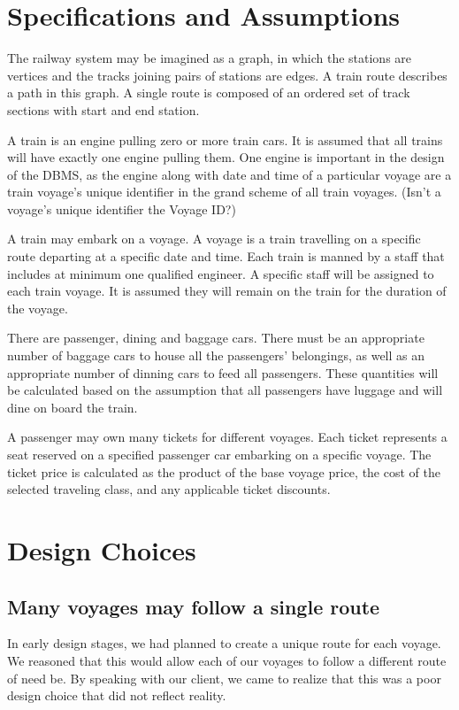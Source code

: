 \documentclass[a4paper]{article}
\begin{document}
\section{Specifications and Assumptions}
The railway system may be imagined as a graph, in which the stations are vertices and the tracks joining pairs of stations are edges. A train route describes a path in this graph.  A single route is composed of an ordered set of track sections with start and end station.

A train is an engine pulling zero or more train cars. It is assumed that all trains will have exactly one engine pulling them. One engine is important in the design of the DBMS, as the engine along with date and time of a particular voyage are a train voyage’s unique identifier in the grand scheme of all train voyages.  (Isn’t a voyage’s unique identifier the Voyage ID?)

A train may embark on a voyage. A voyage is a train travelling on a specific route departing at a specific date and time. Each train is manned by a staff that includes at minimum one qualified engineer. A specific staff will be assigned to each train voyage. It is assumed they will remain on the train for the duration of the voyage.  

There are passenger, dining and baggage cars. There must be an appropriate number of baggage cars to house all the passengers’ belongings, as well as an appropriate number of dinning cars to feed all passengers. These quantities will be calculated based on the assumption that all passengers have luggage and will dine on board the train. 

A passenger may own many tickets for different voyages. Each ticket represents a seat reserved on a specified passenger car embarking on a specific voyage. The ticket price is calculated as the product of the base voyage price, the cost of the selected traveling class, and any applicable ticket discounts. 


\section{Design Choices}
\subsection*{Many voyages may follow a single route}
In early design stages, we had planned to create a unique route for each voyage. We reasoned that this would allow each of our voyages to follow a different route of need be. By speaking with our client, we came to realize that this was a poor design choice that did not reflect reality. 
\end{document}
